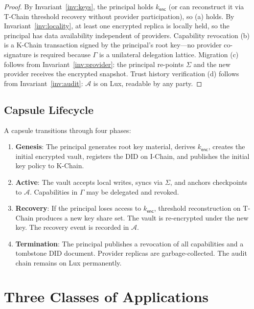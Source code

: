 \documentclass[11pt,a4paper]{article}
\begin{document}
\begin{proof}
By Invariant~\ref{inv:keys}, the principal holds $k_{\mathsf{enc}}$ (or can
reconstruct it via T-Chain threshold recovery without provider participation),
so (a) holds. By Invariant~\ref{inv:locality}, at least one encrypted replica
is locally held, so the principal has data availability independent of providers.
Capability revocation (b) is a K-Chain transaction signed by the principal's root
key---no provider co-signature is required because $\Gamma$ is a unilateral
delegation lattice. Migration (c) follows from Invariant~\ref{inv:provider}:
the principal re-points $\Sigma$ and the new provider receives the encrypted
snapshot. Trust history verification (d) follows from Invariant~\ref{inv:audit}:
$\mathcal{A}$ is on Lux, readable by any party.
\end{proof}

\subsection{Capsule Lifecycle}

A capsule transitions through four phases:

\begin{enumerate}[nosep]
  \item \textbf{Genesis}: The principal generates root key material, derives
        $k_{\mathsf{enc}}$, creates the initial encrypted vault, registers the
        DID on I-Chain, and publishes the initial key policy to K-Chain.
  \item \textbf{Active}: The vault accepts local writes, syncs via $\Sigma$,
        and anchors checkpoints to $\mathcal{A}$. Capabilities in $\Gamma$
        may be delegated and revoked.
  \item \textbf{Recovery}: If the principal loses access to $k_{\mathsf{enc}}$,
        threshold reconstruction on T-Chain produces a new key share set.
        The vault is re-encrypted under the new key. The recovery event is
        recorded in $\mathcal{A}$.
  \item \textbf{Termination}: The principal publishes a revocation of all
        capabilities and a tombstone DID document. Provider replicas are
        garbage-collected. The audit chain remains on Lux permanently.
\end{enumerate}

\section{Three Classes of Applications}\label{sec:apps}
\end{document}

